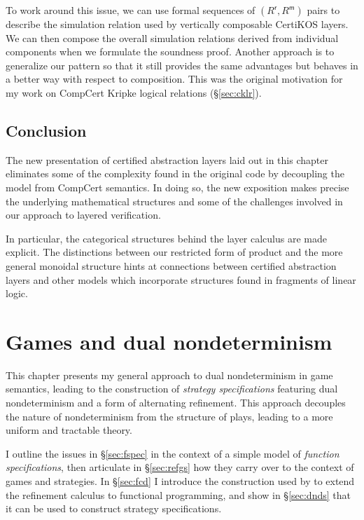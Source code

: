\documentclass[11pt,oneside]{book}
\theoremstyle{definition}
\newcommand{\kw}[1]{\ensuremath{ \mathsf{#1} }}
\begin{document}
To work around this issue,
we can use formal sequences of
$(R^\kw{r}, R^\kw{m})$ pairs to describe the
simulation relation used by vertically composable
CertiKOS layers.
We can then compose 
the overall simulation relations derived from
individual components
when we formulate the soundness proof.
Another approach is to generalize our pattern
so that it still provides the same advantages
but behaves in a better way
with respect to composition.
This was the original motivation
for my work on
CompCert Kripke logical relations
(\S\ref{sec:cklr}).



\section{Conclusion} %

The new presentation of certified abstraction layers
laid out in this chapter
eliminates some of the complexity found in the original code
by decoupling the model from CompCert semantics.
In doing so,
the new exposition makes precise the underlying mathematical structures
and some of the challenges involved in
our approach to layered verification.

In particular,
the categorical structures behind the layer calculus
are made explicit.
The distinctions between our restricted form of product
and the more general monoidal structure
hints at connections between certified abstraction layers
and other models which incorporate structures
found in fragments of linear logic.




\chapter{Games and dual nondeterminism} \label{sec:games-dnd} %

This chapter presents my general approach
to dual nondeterminism in game semantics,
leading to the construction of \emph{strategy specifications}
featuring dual nondeterminism and a form of alternating refinement.
This approach decouples the nature of nondeterminism
from the structure of plays,
leading to a more uniform and tractable theory.

I outline the issues in \S\ref{sec:fspec}
in the context of a simple model of \emph{function specifications},
then articulate in \S\ref{sec:refgs}
how they carry over to the context of games and strategies.
In \S\ref{sec:fcd} I introduce the construction used by \citet{augtyp}
to extend the refinement calculus to functional programming,
and show in \S\ref{sec:dnds} that it can be used
to construct strategy specifications.
\end{document}
